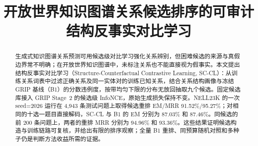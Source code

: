 \documentclass{article}
\title{开放世界知识图谱关系候选排序的可审计结构反事实对比学习}
\author{}
\newcommand{\scc}{\textsc{SC-CL}}
\newcommand{\bone}{\textsc{B1}}
\begin{document}
\maketitle

\begin{abstract}
生成式知识图谱关系预测可用候选级对比学习强化关系辨别，但困难候选的来源与真假边界常不明确；在开放世界知识图谱中，未标注关系也不能直接视为假事实。本文提出结构反事实对比学习（Structure-Counterfactual Contrastive Learning, \scc）：从训练关系词表中过滤正确关系及同一实体对的训练已知关系，结合关系结构画像与冻结 GRIP 基线（\bone）的分数违例度，按带均匀下限的分布无放回抽取九个候选。固定候选库接入 GRIP Stage~2 的候选级 InfoNCE，原始生成损失保持不变。NELL23K 的一次 seed=2026 运行在 4,943 条测试问题上取得候选重排 EM/MRR 91.52\%/95.27\%；对相同的十选一题目直接解码，\scc{} 与 \bone{} 的 EM 分别为 87.03\% 和 87.46\%。同候选的前 200 条问题上，两者的重排 MRR 分别为 94.96\% 和 93.36\%。这些结果证明候选构造与训练链路可复核，并给出有限的排序观察；全量 \bone{} 重排、同预算随机对照和多种子仍是判断方法收益所需的证据。
\end{abstract}









\clearpage
\appendix




\end{document}

